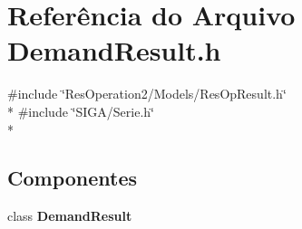 \section{Referência do Arquivo Demand\+Result.\+h}
\label{_2_models_2_demand_2_demand_result_8h}
{\ttfamily \#include \char`\"{}Res\+Operation2/\+Models/\+Res\+Op\+Result.\+h\char`\"{}}\\*
{\ttfamily \#include \char`\"{}S\+I\+G\+A/\+Serie.\+h\char`\"{}}\\*
\subsection*{Componentes}
\begin{DoxyCompactItemize}
\item 
class {\bf Demand\+Result}
\end{DoxyCompactItemize}
